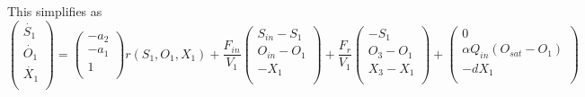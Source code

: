 This simplifies as 
$$\begin{pmatrix}
\dot{S_{1}}\\
\dot{O_{1}}\\
\dot{X_{1}}\\
\end{pmatrix}=\begin{pmatrix}
-a_{2}\\
-a_{1}\\
1\\
\end{pmatrix}
r(S_{1},O_{1},X_{1})+\dfrac{F_{in}}{V_{1}}\begin{pmatrix}
S_{in}-S_{1}\\
O_{in}-O_{1}\\
-X_{1}\\
\end{pmatrix}+
\dfrac{F_{r}}{V_{1}}
\begin{pmatrix}
-S_{1}\\
O_{3}-O_{1}\\
X_{3}-X_{1}\\
\end{pmatrix}+
\begin{pmatrix}
0\\
\alpha Q_{in}(O_{sat}-O_{1})\\
-dX_{1}\\
\end{pmatrix}$$
